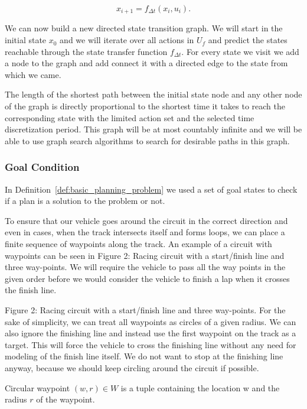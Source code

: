 \[
	x_{i+1}=f_{\Delta t}(x_i, u_i).
\]

We can now build a new directed state transition graph. We will start in the initial state $x_0$ and we will iterate over all actions in $U_f$ and predict the states reachable through the state transfer function $f_{\Delta t}$. For every state we visit we add a node to the graph and add connect it with a directed edge to the state from which we came.

The length of the shortest path between the initial state node and any other node of the graph is directly proportional to the shortest time it takes to reach the corresponding state with the limited action set and the selected time discretization period. This graph will be at most countably infinite and we will be able to use graph search algorithms to search for desirable paths in this graph.

\subsubsection{Goal Condition}

In Definition~\ref{def:basic_planning_problem} we used a set of goal states to check if a plan is a solution to the problem or not. 


To ensure that our vehicle goes around the circuit in the correct direction and even in cases, when the track intersects itself and forms loops, we can place a finite sequence of waypoints along the track. An example of a circuit with waypoints can be seen in Figure 2: Racing circuit with a start/finish line and three way-points. 
We will require the vehicle to pass all the way points in the given order before we would consider the vehicle to finish a lap when it crosses the finish line.

Figure 2: Racing circuit with a start/finish line and three way-points.
For the sake of simplicity, we can treat all waypoints as circles of a given radius. We can also ignore the finishing line and instead use the first waypoint on the track as a target. This will force the vehicle to cross the finishing line without any need for modeling of the finish line itself. We do not want to stop at the finishing line anyway, because we should keep circling around the circuit if possible.

\begin{defn}
	Circular waypoint $\left(w,r\right)\in W$ is a tuple containing the location w and the radius $r$ of the waypoint.
\end{defn}

